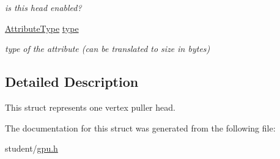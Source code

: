 \begin{DoxyCompactItemize}
\begin{DoxyCompactList}\small\item\em is this head enabled? \end{DoxyCompactList}\item 
\mbox{\label{structGPUVertexPullerHead_a9089a3fc5f91332981d4fc5cb9c0226c}} 
\hyperlink{gpu_8h_a349a9cde14be8097df865ba0469c0ab2}{Attribute\+Type} \hyperlink{structGPUVertexPullerHead_a9089a3fc5f91332981d4fc5cb9c0226c}{type}
\begin{DoxyCompactList}\small\item\em type of the attribute (can be translated to size in bytes) \end{DoxyCompactList}\end{DoxyCompactItemize}


\subsection{Detailed Description}
This struct represents one vertex puller head. 

The documentation for this struct was generated from the following file\+:\begin{DoxyCompactItemize}
\item 
student/\hyperlink{gpu_8h}{gpu.\+h}\end{DoxyCompactItemize}
